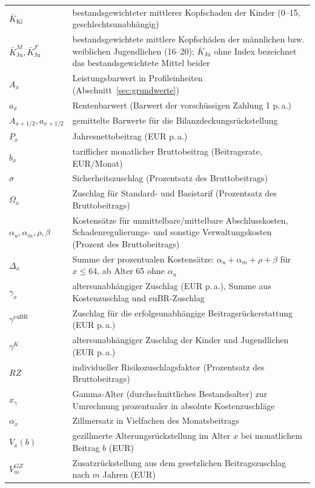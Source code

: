\begin{center}
\begin{longtable}{@{}lp{13.5cm}@{}}
$\bar{K}_{\mathrm{Ki}}$ & bestandsgewichteter mittlerer Kopfschaden der Kinder (0--15, geschlechtsunabhängig) \\
$\bar{K}^{M}_{\mathrm{Ju}}, \bar{K}^{F}_{\mathrm{Ju}}$ & bestandsgewichtete mittlere Kopfschäden der männlichen bzw. weiblichen Jugendlichen (16--20); $\bar{K}_{\mathrm{Ju}}$ ohne Index bezeichnet das bestandsgewichtete Mittel beider \\
$A_x$ & Leistungsbarwert in Profileinheiten (Abschnitt~\ref{sec:grundwerte}) \\
$a_x$ & Rentenbarwert (Barwert der vorschüssigen Zahlung 1 p.\,a.) \\
$A_{x+1/2}, a_{x+1/2}$ & gemittelte Barwerte für die Bilanzdeckungsrückstellung \\
$P_x$ & Jahresnettobeitrag (EUR p.\,a.) \\
$b_x$ & tariflicher monatlicher Bruttobeitrag (Beitragsrate, EUR/Monat) \\
$\sigma$ & Sicherheitszuschlag (Prozentsatz des Bruttobeitrags) \\
$\Omega_x$ & Zuschlag für Standard- und Basistarif (Prozentsatz des Bruttobeitrags) \\
$\alpha_u, \alpha_m, \rho, \beta$ & Kostensätze für unmittelbare/mittelbare Abschlusskosten, Schadenregulierungs- und sonstige Verwaltungskosten (Prozent des Bruttobeitrags) \\
$\Delta_x$ & Summe der prozentualen Kostensätze: $\alpha_u + \alpha_m + \rho + \beta$ für $x \le 64$, ab Alter 65 ohne $\alpha_u$ \\
$\gamma_x$ & altersunabhängiger Zuschlag (EUR p.\,a.), Summe aus Kostenzuschlag und euBR-Zuschlag \\
$\gamma^{\mathrm{euBR}}$ & Zuschlag für die erfolgsunabhängige Beitragsrückerstattung (EUR p.\,a.) \\
$\gamma^{K}$ & altersunabhängiger Zuschlag der Kinder und Jugendlichen (EUR p.\,a.) \\
$RZ$ & individueller Risikozuschlagsfaktor (Prozentsatz des Bruttobeitrags) \\
$x_\gamma$ & Gamma-Alter (durchschnittliches Bestandsalter) zur Umrechnung prozentualer in absolute Kostenzuschläge \\
$\alpha_x$ & Zillmersatz in Vielfachen des Monatsbeitrags \\
$V_{x}(b)$ & gezillmerte Alterungsrückstellung im Alter $x$ bei monatlichem Beitrag $b$ (EUR) \\
$V^{GZ}_{m}$ & Zusatzrückstellung aus dem gesetzlichen Beitragszuschlag nach $m$ Jahren (EUR) \\

\end{longtable}
\end{center}
